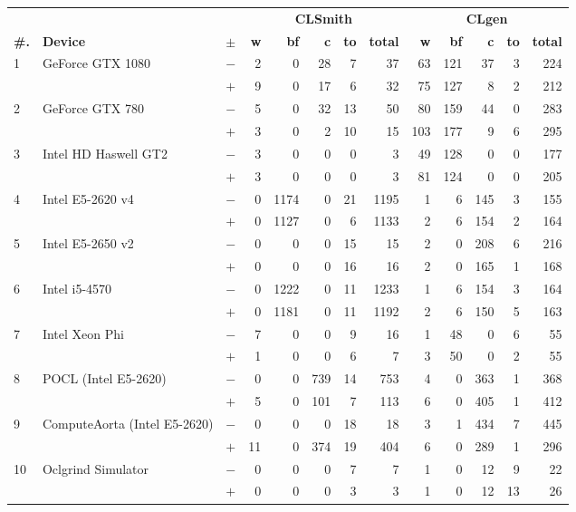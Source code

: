   \begin{tabular}{lll | rrrrr | rrrrr }
  \toprule
  & & & \multicolumn{5}{c|}{\textbf{CLSmith}} & \multicolumn{5}{c}{\textbf{CLgen}} \\
  \textbf{\#.} & \textbf{Device} & $\pm$ &
  \textbf{w} & \textbf{bf} & \textbf{c} & \textbf{to} & \textbf{total} &
  \textbf{w} & \textbf{bf} & \textbf{c} & \textbf{to} & \textbf{total} \\
  \midrule
  \multirow{ 2}{*}{1} & \multirow{ 2}{*}{GeForce GTX 1080} & $-$ & 2 & 0 & 28 & 7 & 37       & 63 & 121 & 37 & 3 & 224 \\& & $+$ & 9 & 0 & 17 & 6 & 32 & 75 & 127 & 8 & 2 & 212 \\
\hline
\multirow{ 2}{*}{2} & \multirow{ 2}{*}{GeForce GTX 780} & $-$ & 5 & 0 & 32 & 13 & 50       & 80 & 159 & 44 & 0 & 283 \\& & $+$ & 3 & 0 & 2 & 10 & 15 & 103 & 177 & 9 & 6 & 295 \\
\hline
\multirow{ 2}{*}{3} & \multirow{ 2}{*}{Intel HD Haswell GT2} & $-$ & 3 & 0 & 0 & 0 & 3       & 49 & 128 & 0 & 0 & 177 \\& & $+$ & 3 & 0 & 0 & 0 & 3 & 81 & 124 & 0 & 0 & 205 \\
\hline
\multirow{ 2}{*}{4} & \multirow{ 2}{*}{Intel E5-2620 v4} & $-$ & 0 & 1174 & 0 & 21 & 1195       & 1 & 6 & 145 & 3 & 155 \\& & $+$ & 0 & 1127 & 0 & 6 & 1133 & 2 & 6 & 154 & 2 & 164 \\
\hline
\multirow{ 2}{*}{5} & \multirow{ 2}{*}{Intel E5-2650 v2} & $-$ & 0 & 0 & 0 & 15 & 15       & 2 & 0 & 208 & 6 & 216 \\& & $+$ & 0 & 0 & 0 & 16 & 16 & 2 & 0 & 165 & 1 & 168 \\
\hline
\multirow{ 2}{*}{6} & \multirow{ 2}{*}{Intel i5-4570} & $-$ & 0 & 1222 & 0 & 11 & 1233       & 1 & 6 & 154 & 3 & 164 \\& & $+$ & 0 & 1181 & 0 & 11 & 1192 & 2 & 6 & 150 & 5 & 163 \\
\hline
\multirow{ 2}{*}{7} & \multirow{ 2}{*}{Intel Xeon Phi} & $-$ & 7 & 0 & 0 & 9 & 16       & 1 & 48 & 0 & 6 & 55 \\& & $+$ & 1 & 0 & 0 & 6 & 7 & 3 & 50 & 0 & 2 & 55 \\
\hline
\multirow{ 2}{*}{8} & \multirow{ 2}{*}{POCL (Intel E5-2620)} & $-$ & 0 & 0 & 739 & 14 & 753       & 4 & 0 & 363 & 1 & 368 \\& & $+$ & 5 & 0 & 101 & 7 & 113 & 6 & 0 & 405 & 1 & 412 \\
\hline
\multirow{ 2}{*}{9} & \multirow{ 2}{*}{ComputeAorta (Intel E5-2620)} & $-$ & 0 & 0 & 0 & 18 & 18       & 3 & 1 & 434 & 7 & 445 \\& & $+$ & 11 & 0 & 374 & 19 & 404 & 6 & 0 & 289 & 1 & 296 \\
\hline
\multirow{ 2}{*}{10} & \multirow{ 2}{*}{Oclgrind Simulator} & $-$ & 0 & 0 & 0 & 7 & 7       & 1 & 0 & 12 & 9 & 22 \\& & $+$ & 0 & 0 & 0 & 3 & 3 & 1 & 0 & 12 & 13 & 26 \\
  \bottomrule
\end{tabular}

